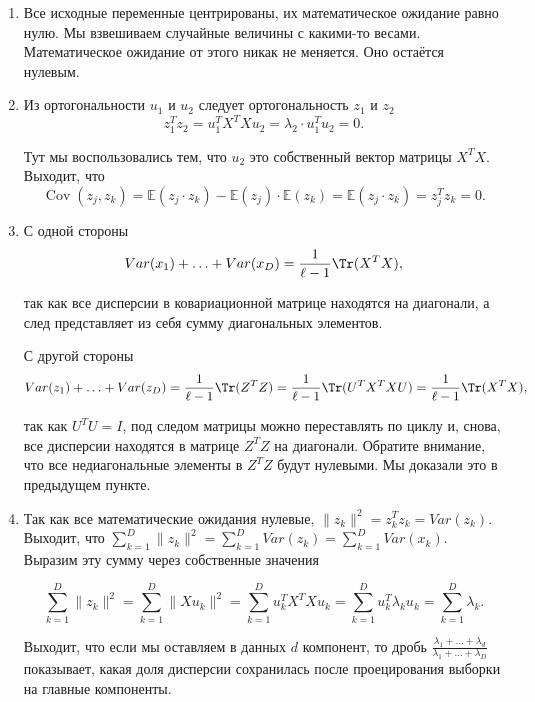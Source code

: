 \documentclass[12pt,fleqn]{article}
\DeclareMathOperator{\Cov}{Cov}
\def \E{\mathbb{E}}
\begin{document}
\begin{esSolution}
    \begin{enumerate} 
        \item Все исходные переменные центрированы, их математическое ожидание равно нулю. Мы взвешиваем случайные величины с какими-то весами. Математическое ожидание от этого никак не меняется. Оно остаётся нулевым. 
        
        \item Из ортогональности $u_1$ и $u_2$ следует ортогональность $z_1$ и $z_2$
        \[
        z_1^T z_2 = u_1^TX^TXu_2 = \lambda_2 \cdot u_1^T u_2 = 0.
        \]
        
        Тут мы воспользовались тем, что $u_2$ это собственный вектор матрицы $X^TX$. Выходит, что 
        \[
        \Cov(z_j, z_k) = \E(z_j \cdot z_k) - \E(z_j) \cdot \E(z_k) = \E(z_j \cdot z_k) = z_j^T z_k = 0.
        \]
        
        \item С одной стороны \[Var(x_1) + \ldots + Var(x_D) = \frac{1}{\ell -1}\Tr(X^TX),\] 
        
        так как все дисперсии в ковариационной матрице находятся на диагонали, а след представляет из себя сумму диагональных элементов. 
        
        С другой стороны  \[Var(z_1) + \ldots + Var(z_D) = \frac{1}{\ell - 1}\Tr(Z^TZ) = \frac{1}{\ell - 1}\Tr(U^TX^TXU) = \frac{1}{\ell - 1}\Tr(X^TX),\]
        
        так как $U^TU = I$, под следом матрицы можно переставлять по циклу и, снова, все дисперсии находятся в матрице $Z^TZ$ на диагонали. Обратите внимание, что все недиагональные элементы в $Z^TZ$ будут нулевыми. Мы доказали это в предыдущем пункте. 
        
        \item Так как все математические ожидания нулевые, $\|z_k\|^2 = z_k^Tz_k = Var(z_k).$ Выходит, что $\sum_{k=1}^D \|z_k\|^2 = \sum_{k=1}^D Var(z_k) = \sum_{k=1}^D Var(x_k).$ Выразим эту сумму через собственные значения
        
        \[\sum_{k=1}^D \|z_k\|^2 = \sum_{k=1}^D \|Xu_k\|^2 = \sum_{k=1}^D u_k^T X^T X u_k = \sum_{k=1}^D u_k^T \lambda_k u_k = \sum_{k=1}^D \lambda_k.\]
        
        Выходит, что если мы оставляем в данных $d$ компонент, то дробь $\frac{\lambda_1 + \ldots + \lambda_d}{\lambda_1 + \ldots + \lambda_D}$ показывает, какая доля дисперсии сохранилась после проецирования выборки на главные компоненты. 
     \end{enumerate}
\end{esSolution}
\end{document}

